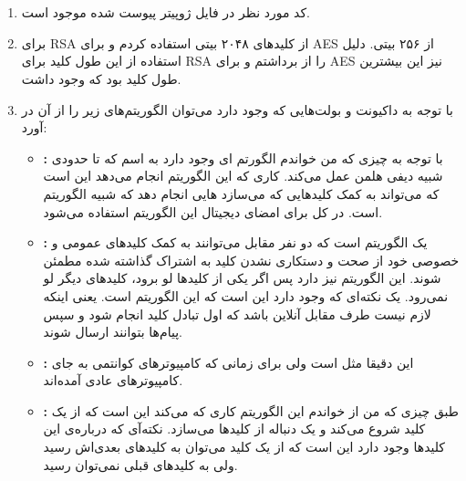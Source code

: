 \documentclass[]{article}
\begin{document}
\section{}
\begin{enumerate}
    \item کد مورد نظر در فایل ژوپیتر پیوست شده موجود است.
    \item برای RSA از کلید‌‌های ۲۰۴۸ بیتی استفاده کردم و برای AES از ۲۵۶ بیتی.
    دلیل استفاده از این طول کلید برای RSA را از
    برداشتم و برای
    AES
    نیز این بیشترین طول کلید بود که وجود داشت.
    \item با توجه به داکیونت و بولت‌هایی که وجود دارد می‌توان الگوریتم‌های زیر را از آن در آورد:
    \begin{itemize}
        \item \textbf{:} با توجه به چیزی که من خواندم الگورتم ای
        وجود دارد به اسم
        که تا حدودی شبیه دیفی هلمن عمل می‌کند. کاری که این الگوریتم
        انجام می‌دهد این است که می‌تواند به کمک کلید‌هایی که
        می‌سازد
        هایی
        انجام دهد که شبیه الگوریتم
        است. در کل برای امضای دیجیتال این الگوریتم استفاده می‌شود.
        \item \textbf{:} یک الگوریتم 
        است که دو نفر مقابل می‌توانند به کمک کلید‌های عمومی و خصوصی خود از صحت و دستکاری نشدن کلید به اشتراک گذاشته شده
        مطمئن شوند. این الگوریتم
        نیز دارد پس اگر یکی از کلید‌ها لو برود، کلید‌های دیگر لو نمی‌رود.
        یک نکته‌ای که وجود دارد این است که این الگوریتم
        است. یعنی اینکه لازم نیست طرف مقابل آنلاین باشد که اول تبادل کلید انجام شود و سپس پیام‌ها بتوانند ارسال شوند.
        \item \textbf{:} این دقیقا مثل  است ولی برای زمانی که کامپیوتر‌های کوانتمی به جای کامپیوتر‌های عادی آمده‌اند.
        \item \textbf{:} طبق چیزی که من از 
        خواندم این الگوریتم کاری که می‌کند این است که از یک کلید شروع می‌کند و یک دنباله از کلید‌ها می‌سازد. نکته‌آی که درباره‌ی این کلید‌ها
        وجود دارد این است که از یک کلید می‌توان به کلید‌های بعدی‌اش رسید ولی به کلید‌‌های قبلی نمی‌توان رسید.

\end{itemize}
\end{enumerate}
\end{document}
